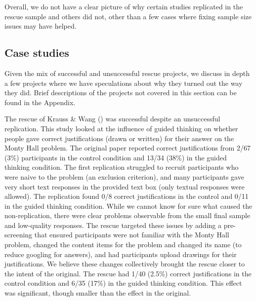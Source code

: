 \documentclass[
  english,
  a4paper,
]{article}
\begin{document}
Overall, we do not have a clear picture of why certain studies replicated in the rescue sample and others did not, other than a few cases where fixing sample size issues may have helped.

\subsection{Case studies}\label{case-studies}

Given the mix of successful and unsuccessful rescue projects, we discuss in depth a few projects where we have speculations about why they turned out the way they did.
Brief descriptions of the projects not covered in this section can be found in the Appendix.

The rescue of Krauss \& Wang () was successful despite an unsuccessful replication.
This study looked at the influence of guided thinking on whether people gave correct justifications (drawn or written) for their answer on the Monty Hall problem.
The original paper reported correct justifications from 2/67 (3\%) participants in the control condition and 13/34 (38\%) in the guided thinking condition.
The first replication struggled to recruit participants who were naive to the problem (an exclusion criterion), and many participants gave very short text responses in the provided text box (only textual responses were allowed).
The replication found 0/8 correct justifications in the control and 0/11 in the guided thinking condition.
While we cannot know for sure what caused the non-replication, there were clear problems observable from the small final sample and low-quality responses.
The rescue targeted these issues by adding a pre-screening that ensured participants were not familiar with the Monty Hall problem, changed the content items for the problem and changed its name (to reduce googling for answers), and had participants upload drawings for their justifications.
We believe these changes collectively brought the rescue closer to the intent of the original.
The rescue had 1/40 (2.5\%) correct justifications in the control condition and 6/35 (17\%) in the guided thinking condition.
This effect was significant, though smaller than the effect in the original.
\end{document}
